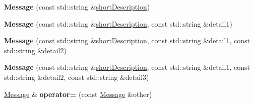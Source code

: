 \begin{DoxyCompactItemize}
\item 
\hypertarget{class_message_aad17a05b7c2d5f1ef207f7150691a03a}{{\bfseries Message} (const std\+::string \&\hyperlink{class_message_a9bd82d96b57df5c4615b6cbbf318175a}{short\+Description})}\label{class_message_aad17a05b7c2d5f1ef207f7150691a03a}

\item 
\hypertarget{class_message_ab77d28861db855dadef024529aab07d8}{{\bfseries Message} (const std\+::string \&\hyperlink{class_message_a9bd82d96b57df5c4615b6cbbf318175a}{short\+Description}, const std\+::string \&detail1)}\label{class_message_ab77d28861db855dadef024529aab07d8}

\item 
\hypertarget{class_message_ae8c66f7de0811d86765369a4c430bb6c}{{\bfseries Message} (const std\+::string \&\hyperlink{class_message_a9bd82d96b57df5c4615b6cbbf318175a}{short\+Description}, const std\+::string \&detail1, const std\+::string \&detail2)}\label{class_message_ae8c66f7de0811d86765369a4c430bb6c}

\item 
\hypertarget{class_message_a65fcd0b70c65cf7b9b9de390386cef79}{{\bfseries Message} (const std\+::string \&\hyperlink{class_message_a9bd82d96b57df5c4615b6cbbf318175a}{short\+Description}, const std\+::string \&detail1, const std\+::string \&detail2, const std\+::string \&detail3)}\label{class_message_a65fcd0b70c65cf7b9b9de390386cef79}

\item 
\hypertarget{class_message_a8003315e3355d1b0a5e3b7dcd5a0514c}{\hyperlink{class_message}{Message} \& {\bfseries operator=} (const \hyperlink{class_message}{Message} \&other)}\label{class_message_a8003315e3355d1b0a5e3b7dcd5a0514c}


\end{DoxyCompactItemize}

